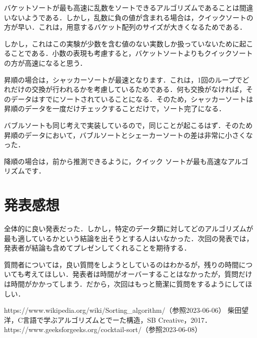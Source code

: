 \documentclass[a4j, titlepage]{jarticle}
\begin{document}
    

    バケットソートが最も高速に乱数をソートできるアルゴリズムであることは間違いないようである．しかし，乱数に負の値が含まれる場合は，クイックソートの方が早い．これは，用意するバケット配列のサイズが大きくなるためである．
    
    しかし，これはこの実験が少数を含む値のない実数しか扱っていないために起こることである．小数の表現も考慮すると，バケットソートよりもクイックソートの方が高速になると思う．
    
    昇順の場合は，シャッカーソートが最速となります．これは，1回のループでどれだけの交換が行われるかを考慮しているためである．何も交換がなければ，そのデータはすでにソートされていることになる．そのため，シャッカーソートは昇順のデータを一度だけチェックすることだけで，ソート完了になる．
    
    バブルソートも同じ考えで実装しているので，同じことが起こるはず．そのため昇順のデータにおいて，バブルソートとシェーカーソートの差は非常に小さくなった．
    
    降順の場合は，前から推測できるように，クイック ソートが最も高速なアルゴリズムです．

    \section{発表感想}
    全体的に良い発表だった．しかし，特定のデータ類に対してどのアルゴリズムが最も適しているかという結論を出そうとする人はいなかった．次回の発表では，発表者が結論も含めてプレゼンしてくれることを期待する． 
    
    質問者については，良い質問をしようとしているのはわかるが，残りの時間についても考えてほしい．発表者は時間がオーバーすることはなかったが，質問だけは時間がかかってしまう．だから，次回はもっと簡潔に質問をするようにしてほしい．

    \begin{thebibliography}{99}
        https://www.wikipedia.org/wiki/Sorting\_algorithm/（参照2023-06-06）
        柴田望洋，C言語で学ぶアルゴリズムとでーた構造，SB Creative，2017．
        https://www.geeksforgeeks.org/cocktail-sort/（参照2023-06-08）
      \end{thebibliography}
\end{document}
